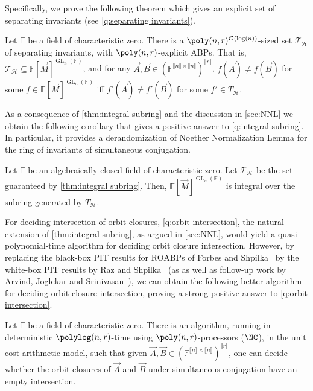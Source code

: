 \documentclass[letterpaper,11pt]{article}
\numberwithin{equation}{section}
\theoremstyle{plain}
\theoremstyle{remark}
\newcommand{\zr}[1]{{\llbracket {#1}\rrbracket}}
\DeclareMathOperator{\GL}{GL}
\newcommand{\F}{\mathbb{F}}
\newcommand{\cH}{\mathcal{H}}
\newcommand{\cT}{\mathcal{T}}
\renewcommand{\O}{\mathcal{O}}
\begin{document}
Specifically, we prove the following theorem which gives an explicit set of separating invariants (see \autoref{q:separating invariants}).

\begin{theorem}\label{thm:integral subring}
	Let $\F$ be a field of characteristic zero. There is a $\poly(n,r)^{\O(\log(n))}$-sized set $\cT_\cH$ of separating invariants, with $\poly(n,r)$-explicit ABPs. That is, $\cT_\cH\subseteq\F[\vec{M}]^{\GL_n(\F)}$, and for any $\vec{A},\vec{B}\in(\F^{\zr{n}\times \zr{n}})^{\zr{r}}$, $f(\vec{A})\ne f(\vec{B})$ for some $f\in\F[\vec{M}]^{\GL_n(\F)}$ iff $f'(\vec{A})\ne f'(\vec{B})$ for some $f'\in T_\cH$.
\end{theorem}

As a consequence of \autoref{thm:integral subring} and the discussion in \autoref{sec:NNL} we obtain the following corollary that gives a positive answer to \autoref{q:integral subring}. In particular, it provides a derandomization of Noether Normalization Lemma for the ring of invariants of simultaneous conjugation.

\begin{corollary}\label{Cor:main integral}
	Let $\F$ be an algebraically closed field of characteristic zero. Let $\cT_\cH$ be the set guaranteed by \autoref{thm:integral subring}. Then, $\F[\vec{M}]^{\GL_n(\F)}$ is integral over the subring generated by $T_\cH$.
\end{corollary}

For deciding intersection of orbit closures, \autoref{q:orbit intersection}, the natural extension of \autoref{thm:integral subring}, as argued in \autoref{sec:NNL}, would yield a quasi-polynomial-time algorithm for deciding orbit closure intersection.  However, by replacing the black-box PIT results for ROABPs of Forbes and Shpilka~\cite{ForbesShpilka12a} by the white-box PIT results by Raz and Shpilka~\cite{RazShpilka05} (as as well as follow-up work by Arvind, Joglekar and Srinivasan~\cite{ArvindJS09}), we can obtain the following better algorithm for deciding orbit closure intersection, proving a strong positive answer to \autoref{q:orbit intersection}.

\begin{theorem}\label{thm:orbit intersection}
	Let $\F$ be a field of characteristic zero. There is an algorithm, running in deterministic $\polylog(n,r)$-time using $\poly(n,r)$-processors ($\NC$), in the unit cost arithmetic model, such that given $\vec{A},\vec{B}\in(\F^{\zr{n}\times \zr{n}})^{\zr{r}}$, one can decide whether the orbit closures of $\vec{A}$ and $\vec{B}$ under simultaneous conjugation have an empty intersection.
\end{theorem}
\end{document}
